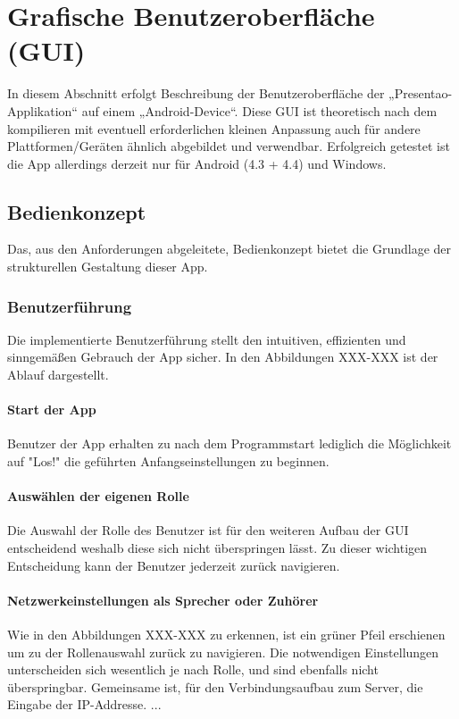 \chapter{Grafische Benutzeroberfläche (GUI)}
\thispagestyle{fancy}
\label{Grafische Benutzeroberfläche}
In diesem Abschnitt erfolgt Beschreibung der Benutzeroberfläche der „Presentao-Applikation“ auf einem „Android-Device“. Diese GUI ist theoretisch nach dem kompilieren mit eventuell erforderlichen kleinen Anpassung auch für andere Plattformen/Geräten ähnlich abgebildet und verwendbar. Erfolgreich getestet ist die App allerdings derzeit nur für Android (4.3 + 4.4) und Windows.
\section{Bedienkonzept}
Das, aus den Anforderungen abgeleitete, Bedienkonzept bietet die Grundlage der strukturellen Gestaltung dieser App.
\subsection{Benutzerführung}
Die implementierte Benutzerführung stellt den intuitiven, effizienten und sinngemäßen Gebrauch der App sicher. In den Abbildungen XXX-XXX ist der Ablauf dargestellt.
\subsubsection{Start der App}
Benutzer der App erhalten zu nach dem Programmstart lediglich die Möglichkeit auf "Los!" die geführten Anfangseinstellungen zu beginnen.
\subsubsection{Auswählen der eigenen Rolle}
Die Auswahl der Rolle des Benutzer ist für den weiteren Aufbau der GUI entscheidend weshalb diese sich nicht überspringen lässt.
Zu dieser wichtigen Entscheidung kann der Benutzer jederzeit zurück navigieren.
\subsubsection{Netzwerkeinstellungen als Sprecher oder Zuhörer}
Wie in den Abbildungen XXX-XXX zu erkennen, ist ein grüner Pfeil erschienen um zu der Rollenauswahl zurück zu navigieren. Die notwendigen Einstellungen unterscheiden sich wesentlich je nach Rolle, und sind ebenfalls nicht überspringbar. Gemeinsame ist, für den Verbindungsaufbau zum Server, die Eingabe der IP-Addresse. ... 
